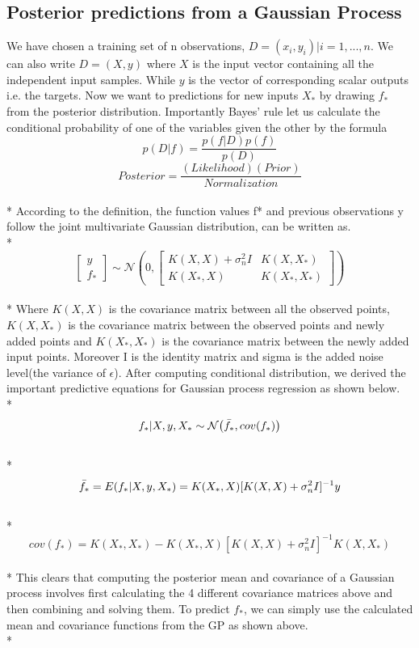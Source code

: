 \documentclass{article}
\begin{document}
\subsection{Posterior predictions from a Gaussian Process}
We have chosen a training set of n observations, $D = {(x_i, y_i) | i = 1, . . . , n}$. We can also write $D = (X, y)$ where $X$ is the input vector containing all the independent input samples. While $y$ is the vector of corresponding scalar outputs i.e. the targets. Now we want to predictions for new inputs $X_*$ by drawing $f_*$ from the posterior distribution. 
Importantly Bayes’ rule let us calculate the conditional probability of one of the variables given the other by the formula
$$p(D|f) = \frac{p(f|D)p(f)}{p(D)}$$
$$ Posterior = \frac{(Likelihood)(Prior)}{Normalization}$$
\\*
According to the definition, the function values f* and previous observations y follow the joint multivariate Gaussian distribution, can be written as.
\\*
$$\begin{bmatrix}
y \\
f_{*}
\end{bmatrix}
\sim \mathcal{N}{\left(0,
\begin{bmatrix}
K(X,X)+\sigma_n^2I &  K(X,X_*)\\
K(X_*,X) & K(X_*,X_*)
\end{bmatrix}
\right)}$$
\\* 
Where $K(X,X)$ is the covariance matrix between all the observed points, $K(X,X_*)$ is the covariance matrix between the observed points and newly added points and $K(X_*,X_*)$ is the covariance matrix between the newly added input points. Moreover I is the identity matrix and sigma is the added noise level(the variance of $\epsilon$). After computing conditional distribution, we derived the important predictive equations for Gaussian process regression as shown below.
\\*
$$f_{*} | X,y,X_{*}\sim \mathcal{N}{\left(\Bar{f_{*}},cov(f_{*})\right)}$$
\\*
$$\Bar{f_{*}} = E(f_{*} | X,y,X_{*}) = K(X_*,X)[K(X,X)+\sigma_n^2I]^{-1}y$$
\\*
$$cov(f_{*})=K(X_*,X_*)-K(X_*,X)[K(X,X)+\sigma_n^2I]^{-1}K(X,X_*)$$
\\*
This clears that computing the posterior mean and covariance of a Gaussian process involves first calculating the 4 different covariance matrices above and then combining  and solving them. 
To predict $f_*$, we can simply use the calculated mean and covariance functions from the GP as shown above. 
\\*
\end{document}
